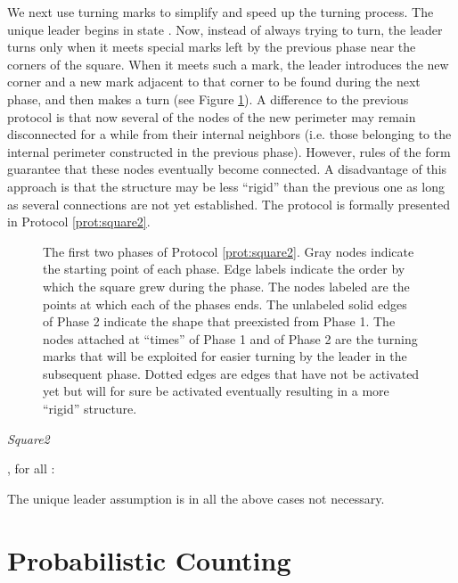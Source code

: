 \documentclass[oribibl, 11pt]{llncs}
\begin{document}
We next use turning marks to simplify and speed up the turning process. The unique leader begins in state . Now, instead of always trying to turn, the leader turns only when it meets special marks left by the previous phase near the corners of the square. When it meets such a mark, the leader introduces the new corner and a new mark adjacent to that corner to be found during the next phase, and then makes a turn (see Figure \ref{fig:square2}). A difference to the previous protocol is that now several of the nodes of the new perimeter may remain disconnected for a while from their internal neighbors (i.e. those belonging to the internal perimeter constructed in the previous phase). However, rules of the form  guarantee that these nodes eventually become connected. A disadvantage of this approach is that the structure may be less ``rigid'' than the previous one as long as several  connections are not yet established. The protocol is formally presented in Protocol \ref{prot:square2}.

\begin{figure}[!hbtp]
\caption{The first two phases of Protocol \ref{prot:square2}. Gray nodes indicate the starting point of each phase. Edge labels indicate the order by which the square grew during the phase. The nodes labeled  are the points at which each of the phases ends. The unlabeled solid edges of Phase 2 indicate the shape that preexisted from Phase 1. The nodes attached at ``times''  of Phase 1 and  of Phase 2 are the turning marks that will be exploited for easier turning by the leader in the subsequent phase. Dotted edges are edges that have not be activated yet but will for sure be activated eventually resulting in a more ``rigid'' structure.} \label{fig:square2}
\end{figure}

\renewcommand{\algorithmiccomment}[1]{// #1}
\begin{algorithm}[!h]
  \caption{\emph{Square2}}\label{prot:square2}
  \begin{algorithmic}
    \medskip
    \State , for all 
    \State : 
    
\end{algorithmic}
\end{algorithm} 

The unique leader assumption is in all the above cases not necessary.

\section{Probabilistic Counting}
\label{sec:counting}
\end{document}
